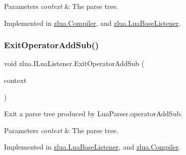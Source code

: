 \begin{DoxyParams}{Parameters}
{\em context} & The parse tree.\\
\hline
\end{DoxyParams}


Implemented in \mbox{\hyperlink{classzlua_1_1_compiler_a7a151e5694262777eecc12f51f1eb1a5}{zlua.\+Compiler}}, and \mbox{\hyperlink{classzlua_1_1_lua_base_listener_abf62739a5cda90c32f65e7a81c3e72a2}{zlua.\+Lua\+Base\+Listener}}.

\mbox{\label{interfacezlua_1_1_i_lua_listener_a3d98f03e4ef336437a07903ea76df622}} 
\subsubsection{\texorpdfstring{Exit\+Operator\+Add\+Sub()}{ExitOperatorAddSub()}}
{\footnotesize\ttfamily void zlua.\+I\+Lua\+Listener.\+Exit\+Operator\+Add\+Sub (\begin{DoxyParamCaption}\item[{\mbox{[}\+Not\+Null\mbox{]} \mbox{\hyperlink{classzlua_1_1_lua_parser_1_1_operator_add_sub_context}{Lua\+Parser.\+Operator\+Add\+Sub\+Context}}}]{context }\end{DoxyParamCaption})}



Exit a parse tree produced by Lua\+Parser.\+operator\+Add\+Sub. 


\begin{DoxyParams}{Parameters}
{\em context} & The parse tree.\\
\hline
\end{DoxyParams}


Implemented in \mbox{\hyperlink{classzlua_1_1_lua_base_listener_aa8686e94c0d6dbf3292a7ed77baa54b5}{zlua.\+Lua\+Base\+Listener}}, and \mbox{\hyperlink{classzlua_1_1_compiler_a1559fa97735e564dc0cc25c6c5ec355a}{zlua.\+Compiler}}.

\mbox{\label{interfacezlua_1_1_i_lua_listener_a5b2a0ab0a1e41daa744680bd657adfa8}} 
